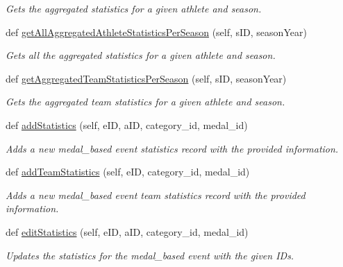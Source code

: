 \begin{DoxyCompactItemize}
\begin{DoxyCompactList}\small\item\em Gets the aggregated statistics for a given athlete and season. \end{DoxyCompactList}\item 
def \hyperlink{classhandler_1_1dao_1_1medal__based__event__dao_1_1_medal_based_event_d_a_o_aea61ef7549c3db1d0947721ba93ec624}{get\+All\+Aggregated\+Athlete\+Statistics\+Per\+Season} (self, s\+ID, season\+Year)
\begin{DoxyCompactList}\small\item\em Gets all the aggregated statistics for a given athlete and season. \end{DoxyCompactList}\item 
def \hyperlink{classhandler_1_1dao_1_1medal__based__event__dao_1_1_medal_based_event_d_a_o_aace94c35a80076a7f173dd970f0f6441}{get\+Aggregated\+Team\+Statistics\+Per\+Season} (self, s\+ID, season\+Year)
\begin{DoxyCompactList}\small\item\em Gets the aggregated team statistics for a given athlete and season. \end{DoxyCompactList}\item 
def \hyperlink{classhandler_1_1dao_1_1medal__based__event__dao_1_1_medal_based_event_d_a_o_ad9b8fae6fc216c19d4f4a4b612c270c8}{add\+Statistics} (self, e\+ID, a\+ID, category\+\_\+id, medal\+\_\+id)
\begin{DoxyCompactList}\small\item\em Adds a new medal\+\_\+based event statistics record with the provided information. \end{DoxyCompactList}\item 
def \hyperlink{classhandler_1_1dao_1_1medal__based__event__dao_1_1_medal_based_event_d_a_o_accdebc9228f1bce35530544e72c7b18c}{add\+Team\+Statistics} (self, e\+ID, category\+\_\+id, medal\+\_\+id)
\begin{DoxyCompactList}\small\item\em Adds a new medal\+\_\+based event team statistics record with the provided information. \end{DoxyCompactList}\item 
def \hyperlink{classhandler_1_1dao_1_1medal__based__event__dao_1_1_medal_based_event_d_a_o_a293d78fa9b81e4a47d3f1c8c0ed899f1}{edit\+Statistics} (self, e\+ID, a\+ID, category\+\_\+id, medal\+\_\+id)
\begin{DoxyCompactList}\small\item\em Updates the statistics for the medal\+\_\+based event with the given I\+Ds. \end{DoxyCompactList}\item 

\end{DoxyCompactItemize}
